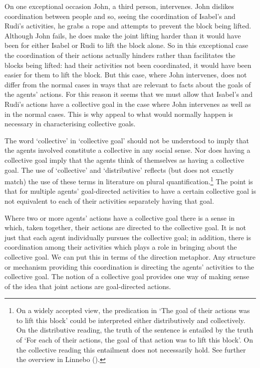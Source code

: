 \documentclass[12pt,a4paper]{extarticle}
\begin{document}
On one exceptional occasion John, a third person, intervenes.  John dislikes coordination between people and so, seeing the coordination of Isabel's and Rudi's activities, he grabs a rope and attempts to prevent the block being lifted.  Although John fails, he does make the joint lifting harder than it would have been for either Isabel or Rudi to lift the block alone.  
So in this exceptional case the coordination of their actions actually hinders rather than facilitates the blocks being lifted:
had their activities not been coordinated, it would have been easier for them to lift the block.
But this case, where John intervenes, does not differ from the normal cases in ways that are relevant to facts about the goals of the agents' actions.  
For this reason it seems that we must allow that Isabel's and Rudi's actions have a collective goal in the case where John intervenes as well as in the normal cases.
This is why appeal to what would normally happen is  necessary in characterising collective goals.



The word `collective' in `collective goal' should not be understood to imply that the agents  involved constitute a collective in any social sense.  Nor does having a collective goal imply that the agents think of themselves as having a collective goal.  The use of `collective' and `distributive' reflects  (but does not exactly match) the use of these terms in literature on plural quantification.\footnote{
On a widely accepted view,  the predication in `The goal of their actions was to lift this block' could be interpreted  either distributively and collectively.  On the distributive reading, the truth of the sentence is entailed by the truth of `For each of their actions, the goal of that action was to lift this block'.  On the collective reading this entailment does not necessarily hold.
See further the overview in Linnebo (\citeyear{Linnebo:2005ig}).  
}
The point is that for multiple agents' goal-directed activities to have a certain collective goal is not equivalent to each of their activities separately having that goal.


Where two or more agents' actions have a collective goal there is a sense in which, taken together, their actions are directed to the collective goal.  
It is not just that each agent individually pursues the collective goal; in addition, there is coordination among their activities which plays a role in bringing about the collective goal.  
We can put this in terms of the direction metaphor.  
Any structure or mechanism providing this coordination is directing the agents' activities to the collective goal.  
The notion of a collective goal provides one way of making sense of the idea that joint actions are goal-directed actions.
\end{document}
